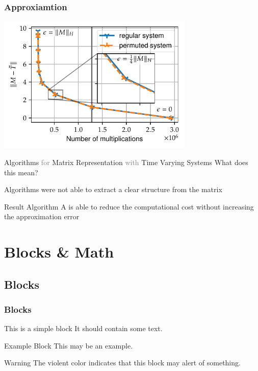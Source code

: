 \documentclass{beamer}
\newcommand{\chapterpage}[1]{
	{\small 
	\textcolor{tumcolor-blue}{Algorithms} 
	\textcolor{gray}{for} 
	\textcolor{tumcolor-blue}{Matrix Representation} 
	\textcolor{gray}{with} 
	\textcolor{tumcolor-blue}{Time Varying Systems}
}
\newline
\phantom{\Huge\emph{} H}
\newline
{\LARGE \textcolor{tumcolor-blue}{#1}}
}
\begin{document}
\begin{frame}
	\frametitle{Approxiamtion}
	\centering
	\includegraphics[width=0.7\textwidth]{../Thesis/Plots/perm_example_mobilenet_error.pdf}
\end{frame}

\begin{frame}
	\chapterpage{What does this mean?}
\end{frame}


\begin{frame}
	Algorithms were not able to extract a clear structure from the matrix
	
	\pause
	\begin{block}{Result}
	Algorithm A is able to reduce the computational cost without increasing the approximation error
	\end{block}

\end{frame}





\section{Blocks \& Math}
\subsection{Blocks}
\begin{frame}
   \frametitle{Blocks}

   \begin{block}{This is a simple block}
      It should contain some text.
   \end{block}

   \begin{exampleblock}{Example Block}
      This may be an example.
   \end{exampleblock}


   \begin{alertblock}{Warning}
      The violent color indicates that this block may alert of something.
   \end{alertblock}
\end{frame}
\end{document}

